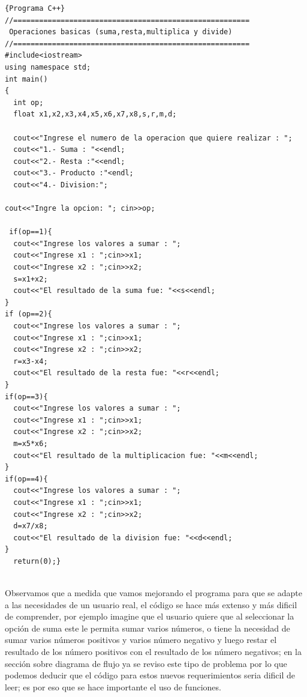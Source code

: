 \documentclass[a4paper,12pt,spanish]{article}
\newcommand\mylstcaption{}
\begin{document}
\renewcommand\mylstcaption{\textbf{operbasi3.cpp}: Operaciones Básicas}

\begin{lstlisting}[frame=trBL,firstnumber=1,caption=\mylstcaption]{Programa C++}
//=======================================================
 Operaciones basicas (suma,resta,multiplica y divide)
//=======================================================
#include<iostream>
using namespace std;
int main()
{
  int op;
  float x1,x2,x3,x4,x5,x6,x7,x8,s,r,m,d;
  
  cout<<"Ingrese el numero de la operacion que quiere realizar : ";
  cout<<"1.- Suma : "<<endl;
  cout<<"2.- Resta :"<<endl;
  cout<<"3.- Producto :"<endl;
  cout<<"4.- Division:";

cout<<"Ingre la opcion: "; cin>>op;

 if(op==1){
  cout<<"Ingrese los valores a sumar : ";
  cout<<"Ingrese x1 : ";cin>>x1;
  cout<<"Ingrese x2 : ";cin>>x2;
  s=x1+x2;
  cout<<"El resultado de la suma fue: "<<s<<endl;
}
if (op==2){
  cout<<"Ingrese los valores a sumar : ";
  cout<<"Ingrese x1 : ";cin>>x1;
  cout<<"Ingrese x2 : ";cin>>x2;
  r=x3-x4;
  cout<<"El resultado de la resta fue: "<<r<<endl;
}
if(op==3){
  cout<<"Ingrese los valores a sumar : ";
  cout<<"Ingrese x1 : ";cin>>x1;
  cout<<"Ingrese x2 : ";cin>>x2;
  m=x5*x6;
  cout<<"El resultado de la multiplicacion fue: "<<m<<endl;
}
if(op==4){
  cout<<"Ingrese los valores a sumar : ";
  cout<<"Ingrese x1 : ";cin>>x1;
  cout<<"Ingrese x2 : ";cin>>x2;
  d=x7/x8;
  cout<<"El resultado de la division fue: "<<d<<endl;
}
  return(0);}
  
\end{lstlisting}



    Observamos que a medida que vamos mejorando el programa para que se adapte a las necesidades de un usuario real, el código se hace más extenso y más dificil de comprender, por ejemplo imagine que el usuario quiere que al seleccionar la opción de suma este le permita sumar varios números, o tiene la necesidad de sumar varios números positivos y varios número negativo y luego restar el resultado de los número positivos con el resultado de los número negativos; en la sección sobre diagrama de flujo ya se reviso este tipo de problema por lo que podemos deducir que el código para estos nuevos requerimientos seria dificil de leer; es por eso que se hace importante el uso de funciones.


\renewcommand\mylstcaption{\textbf{operbasi4.cpp}: Operaciones Básicas}
    
\end{document}
